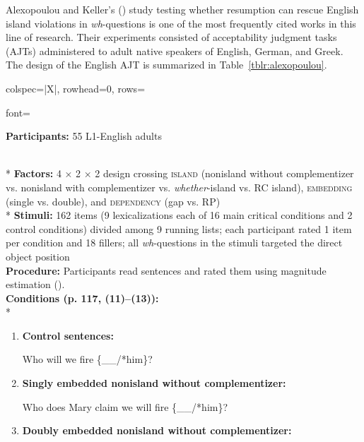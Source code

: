 Alexopoulou and Keller's (\citeyear{alexopoulou.keller2007}) study testing whether resumption can rescue English island violations in \textit{wh}-questions is one of the most frequently cited works in this line of research. Their experiments consisted of acceptability judgment tasks (AJTs) administered to adult native speakers of English, German, and Greek. The design of the English AJT is summarized in Table~\ref{tblr:alexopoulou}.

\begin{longtblr}[caption={\textcite{alexopoulou.keller2007}: English acceptability judgment task}, label={tblr:alexopoulou}]{colspec={|X|}, rowhead=0, rows={font=\raggedright{}}}\hline
\textbf{Participants:} 55 L1-English adults \vspace{5pt}\rule{0pt}{10pt}\\*
\textbf{Factors:} 4 × 2 × 2 design crossing \textsc{island} (nonisland without complementizer vs. nonisland with complementizer vs. \textit{whether}-island vs. RC island), \textsc{embedding} (single vs. double), and \textsc{dependency} (gap vs. RP) \vspace{5pt}\\*
\textbf{Stimuli:} 162 items (9 lexicalizations each of 16 main critical conditions and 2 control conditions) divided among 9 running lists; each participant rated 1 item per condition and 18 fillers; all \textit{wh}-questions in the stimuli targeted the direct object position \vspace{5pt}\\
\textbf{Procedure:} Participants read sentences and rated them using magnitude estimation (\cite{bard.etal1996}).\vspace{5pt}\\
\textbf{Conditions (p. 117, (11)--(13)):} \vspace{5pt}\\*
\begin{varwidth}{\linewidth}\begin{enumerate}[\bfseries (a),itemsep=5pt] 
\item \textbf{Control sentences:}\par\nobreak
Who will we fire \{\_\_/*him\}?
\item \textbf{Singly embedded nonisland without complementizer:}\par\nobreak
Who does Mary claim we will fire \{\_\_/*him\}?
\item \textbf{Doubly embedded nonisland without complementizer:}\par\nobreak

\end{enumerate}
\end{varwidth}
\end{longtblr}
